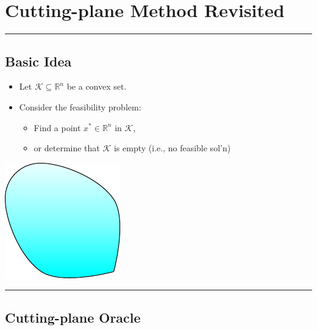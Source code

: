 \documentclass[]{article}
\providecommand{\tightlist}{%
  \setlength{\itemsep}{0pt}\setlength{\parskip}{0pt}}
\begin{document}
\hypertarget{cutting-plane-method-revisited}{%
\section{Cutting-plane Method
Revisited}\label{cutting-plane-method-revisited}}

\begin{center}\rule{0.5\linewidth}{\linethickness}\end{center}

\hypertarget{basic-idea}{%
\subsection{Basic Idea}\label{basic-idea}}

\begin{itemize}
\tightlist
\item
  Let \(\mathcal{K} \subseteq \mathbb{R}^n\) be a convex set.
\item
  Consider the feasibility problem:

  \begin{itemize}
  \tightlist
  \item
    Find a point \(x^* \in \mathbb{R}^n\) in \(\mathcal{K}\),
  \item
    or determine that \(\mathcal{K}\) is empty (i.e., no feasible sol'n)
  \end{itemize}
\end{itemize}

\includegraphics{ellipsoid.files/region.pdf}

\begin{center}\rule{0.5\linewidth}{\linethickness}\end{center}

\hypertarget{cutting-plane-oracle}{%
\subsection{Cutting-plane Oracle}\label{cutting-plane-oracle}}
\end{document}
